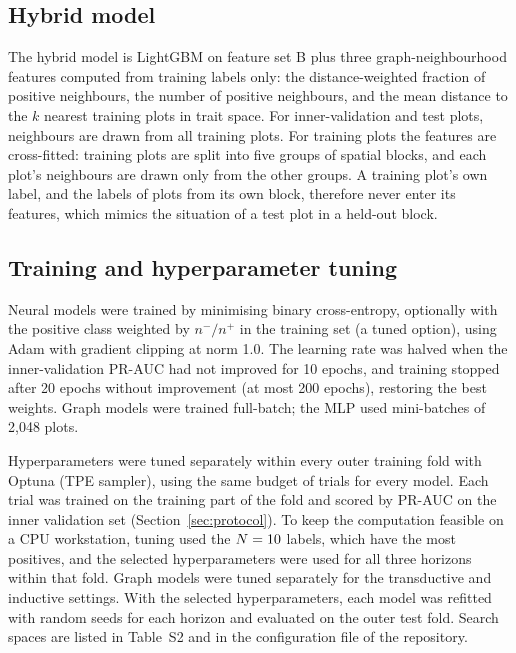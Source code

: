 \documentclass[a4paper,fleqn]{cas-sc}
\begin{document}
\subsection{Hybrid model}

The hybrid model is LightGBM on feature set B plus three graph-neighbourhood features computed from training labels only: the distance-weighted fraction of positive neighbours, the number of positive neighbours, and the mean distance to the $k$ nearest training plots in trait space. For inner-validation and test plots, neighbours are drawn from all training plots. For training plots the features are cross-fitted: training plots are split into five groups of spatial blocks, and each plot's neighbours are drawn only from the other groups. A training plot's own label, and the labels of plots from its own block, therefore never enter its features, which mimics the situation of a test plot in a held-out block.

\subsection{Training and hyperparameter tuning}

Neural models were trained by minimising binary cross-entropy, optionally with the positive class weighted by $n^-/n^+$ in the training set (a tuned option), using Adam \citep{kingma2015} with gradient clipping at norm 1.0. The learning rate was halved when the inner-validation PR-AUC had not improved for 10 epochs, and training stopped after 20 epochs without improvement (at most 200 epochs), restoring the best weights. Graph models were trained full-batch; the MLP used mini-batches of 2{,}048 plots.

Hyperparameters were tuned separately within every outer training fold with Optuna \citep{akiba2019} (TPE sampler), using the same budget of \nTrials{} trials for every model. Each trial was trained on the training part of the fold and scored by PR-AUC on the inner validation set (Section~\ref{sec:protocol}). To keep the computation feasible on a CPU workstation, tuning used the $N = 10$ labels, which have the most positives, and the selected hyperparameters were used for all three horizons within that fold. Graph models were tuned separately for the transductive and inductive settings. With the selected hyperparameters, each model was refitted with \nSeeds{} random seeds for each horizon and evaluated on the outer test fold. Search spaces are listed in Table~S2 and in the configuration file of the repository.
\end{document}
